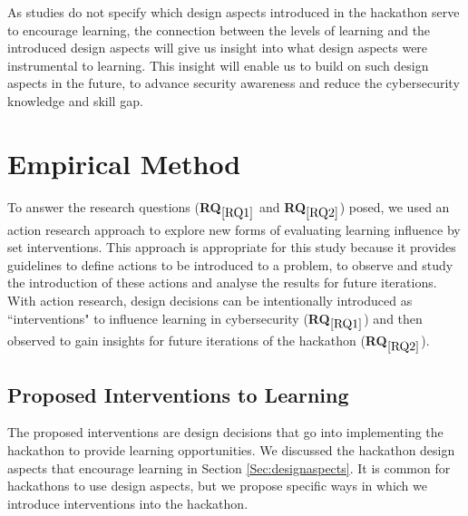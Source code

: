 \documentclass[runningheads]{llncs}
\newcommand{\hr}[1]{\textbf{RQ}$_{\ref{#1}}$}
\begin{document}
As studies do not specify which design aspects introduced in the hackathon serve to encourage learning, the connection between the levels of learning and the introduced design aspects will give us insight into what design aspects were instrumental to learning. This insight will enable us to build on such design aspects in the future, to advance security awareness and reduce the cybersecurity knowledge and skill gap.



\section{Empirical Method}

To answer the research questions (\hr{RQ1} and \hr{RQ2}) posed, we used an action research approach
\cite{bhattacherjee2012social,kaplan1998innovation} to explore new forms of evaluating learning influence by set interventions. This approach is appropriate for this study because it provides guidelines to define actions to be introduced to a problem, to observe and study the introduction of these actions and analyse the results for future iterations. With action research, design decisions can be intentionally introduced as ``interventions" to influence learning in cybersecurity (\hr{RQ1}) and then observed to gain insights for future iterations of the hackathon (\hr{RQ2}).

\subsection{Proposed Interventions to Learning} \label{Sec:interventions}
The proposed interventions are design decisions that go into implementing the hackathon to provide learning opportunities. We discussed the hackathon design aspects that encourage learning in Section \ref{Sec:designaspects}. It is common for hackathons to use design aspects, but we propose specific ways in which we introduce interventions into the hackathon.
\end{document}
